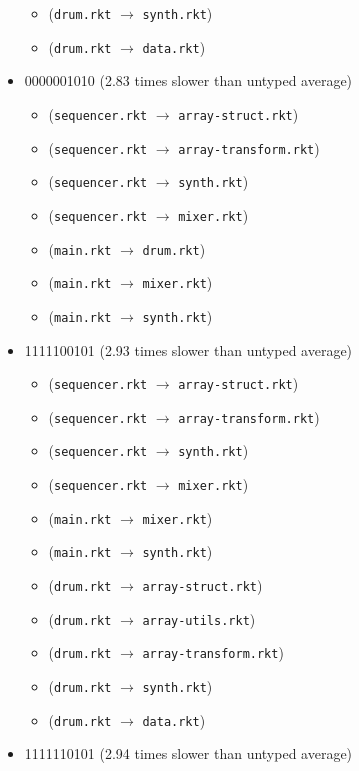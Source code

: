 \documentclass{article}
\newcommand{\mono}[1]{\texttt{#1}}
\begin{document}
\begin{itemize}
\begin{itemize}
  \item (\mono{drum.rkt} $\rightarrow$ \mono{synth.rkt})
  \item (\mono{drum.rkt} $\rightarrow$ \mono{data.rkt})
  \end{itemize}
\item 0000001010 (2.83 times slower than untyped average)
  \begin{itemize}
  \item (\mono{sequencer.rkt} $\rightarrow$ \mono{array-struct.rkt})
  \item (\mono{sequencer.rkt} $\rightarrow$ \mono{array-transform.rkt})
  \item (\mono{sequencer.rkt} $\rightarrow$ \mono{synth.rkt})
  \item (\mono{sequencer.rkt} $\rightarrow$ \mono{mixer.rkt})
  \item (\mono{main.rkt} $\rightarrow$ \mono{drum.rkt})
  \item (\mono{main.rkt} $\rightarrow$ \mono{mixer.rkt})
  \item (\mono{main.rkt} $\rightarrow$ \mono{synth.rkt})
  \end{itemize}
\item 1111100101 (2.93 times slower than untyped average)
  \begin{itemize}
  \item (\mono{sequencer.rkt} $\rightarrow$ \mono{array-struct.rkt})
  \item (\mono{sequencer.rkt} $\rightarrow$ \mono{array-transform.rkt})
  \item (\mono{sequencer.rkt} $\rightarrow$ \mono{synth.rkt})
  \item (\mono{sequencer.rkt} $\rightarrow$ \mono{mixer.rkt})
  \item (\mono{main.rkt} $\rightarrow$ \mono{mixer.rkt})
  \item (\mono{main.rkt} $\rightarrow$ \mono{synth.rkt})
  \item (\mono{drum.rkt} $\rightarrow$ \mono{array-struct.rkt})
  \item (\mono{drum.rkt} $\rightarrow$ \mono{array-utils.rkt})
  \item (\mono{drum.rkt} $\rightarrow$ \mono{array-transform.rkt})
  \item (\mono{drum.rkt} $\rightarrow$ \mono{synth.rkt})
  \item (\mono{drum.rkt} $\rightarrow$ \mono{data.rkt})
  \end{itemize}
\item 1111110101 (2.94 times slower than untyped average)

\end{itemize}
\end{document}
